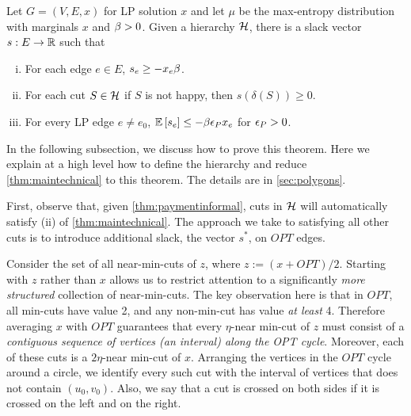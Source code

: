 \begin{theorem}\label{thm:paymentinformal}
Let \hyperlink{tar:G=(V,E,x)}{$G=(V,E,x)$} for LP solution $x$ and let $\mu$ be the max-entropy distribution with marginals $x$ and $\beta > 0$.
Given a hierarchy $\mathcal{H}$, there is a slack vector $s: E\rightarrow \mathbb{R}$  such that
\begin{enumerate}[i)]
\item 	For each edge $e \in E$, $s_e \ge -x_e \beta$. 
\item
For each cut $S\in \mathcal{H}$  if $S$ is not happy, then $s(\delta(S))  \ge  0.$
\item For every LP edge $e\neq e_0$, ${\mathbb{E}}\left[s_e\right]\leq -\beta {\epsilon}_P x_e$ for  ${\epsilon}_P>0$.
\end{enumerate}

\end{theorem}




%  
%
%
In the following subsection, we discuss how to prove this theorem. Here we explain at a high level how to define the hierarchy and reduce \cref{thm:maintechnical} to this theorem. The details are in \cref{sec:polygons}.

First, observe that, given \cref{thm:paymentinformal}, cuts in $\mathcal{H}$ will automatically satisfy (ii) of \cref{thm:maintechnical}. The approach we take to satisfying 
all other cuts is to introduce additional slack, the vector $s^*$, on $OPT$ edges. 

Consider the set of all near-min-cuts of $z$, where $z := (x + OPT)/2$.  Starting with $z$ rather than $x$ allows us to restrict attention to a significantly {\em more structured} collection of near-min-cuts. The key observation here is that in $OPT$, all min-cuts have value 2, and any non-min-cut has value {\em at least} 4. Therefore averaging  $x$ with $OPT$ guarantees that every $\eta$-near min-cut of $z$  must consist of a {\em contiguous sequence of vertices (an interval) along the OPT cycle}. Moreover, each of these cuts is a $2\eta$-near min-cut of $x$.  Arranging the vertices in the $OPT$ cycle around a circle, we identify every such cut with the interval of vertices that does not contain $(u_0, v_0)$. Also, we say that a cut is crossed on both sides if it is crossed on the left and on the right.



